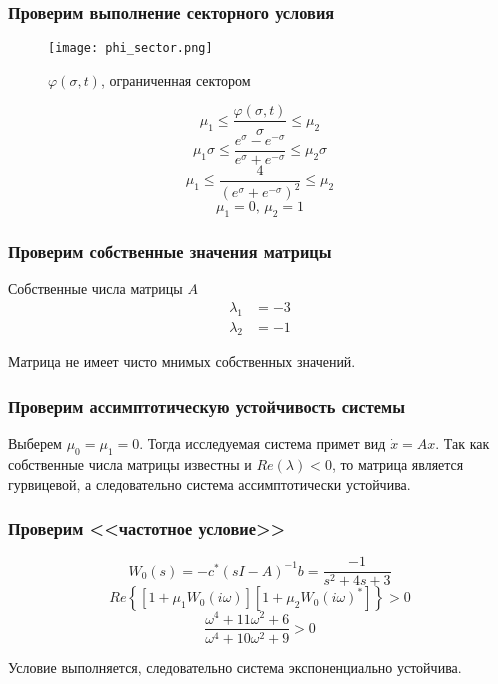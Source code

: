     \subsubsection*{Проверим выполнение секторного условия}
    \begin{figure}[H]
        \centering
        \texttt{[image: phi\_sector.png]}
        \caption{$\varphi(\sigma, t)$, ограниченная сектором}
    \end{figure}

    \[\mu_1 \leq \dfrac{\varphi(\sigma, t)}{\sigma} \leq \mu_2 \]
    \[\mu_1\sigma \leq \dfrac{e^{\sigma} - e^{-\sigma}}{e^{\sigma} + e^{-\sigma}} \leq \mu_2\sigma \]
    \[\mu_1 \leq \dfrac{4}{(e^{\sigma} + e^{-\sigma})^2} \leq \mu_2 \]
    \[\mu_1 = 0,\,\mu_2 = 1\]

    \subsubsection*{Проверим собственные значения матрицы}
    Собственные числа матрицы $A$
    \begin{equation*}
        \begin{aligned}
            \lambda_1 &= -3 \\
            \lambda_2 &= -1
        \end{aligned}
    \end{equation*}

    Матрица не имеет чисто мнимых собственных значений.

    \subsubsection*{Проверим ассимптотическую устойчивость системы}
    Выберем $\mu_0 = \mu_1 = 0$. Тогда исследуемая система примет вид $\dot{x}=Ax$. Так как собственные числа матрицы
    известны и $Re(\lambda) < 0$, то матрица является гурвицевой, а следовательно система ассимптотически устойчива.

    \subsubsection*{Проверим <<частотное условие>>}
    \[W_0(s) = -c^*(sI - A)^{-1}b = \dfrac{-1}{s^2 + 4s + 3}\]
    \[Re\left\{ \left[ 1 + \mu_1 W_0(i\omega) \right] \left[ 1 + \mu_2 W_0(i\omega)^* \right] \right\} > 0\]
    \[\dfrac{\omega^4 + 11\omega^2 + 6}{\omega^4 + 10\omega^2 +9} > 0\]

    Условие выполняется, следовательно система экспоненциально устойчива.

